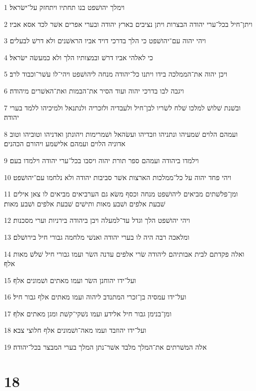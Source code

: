 \par 1 וימלך יהושׁפט בנו תחתיו ויתחזק על־ישׂראל׃
\par 2 ויתן־חיל בכל־ערי יהודה הבצרות ויתן נציבים בארץ יהודה ובערי אפרים אשׁר לכד אסא אביו׃
\par 3 ויהי יהוה עם־יהושׁפט כי הלך בדרכי דויד אביו הראשׁנים ולא דרשׁ לבעלים׃
\par 4 כי לאלהי אביו דרשׁ ובמצותיו הלך ולא כמעשׂה ישׂראל׃
\par 5 ויכן יהוה את־הממלכה בידו ויתנו כל־יהודה מנחה ליהושׁפט ויהי־לו עשׁר־וכבוד לרב׃
\par 6 ויגבה לבו בדרכי יהוה ועוד הסיר את־הבמות ואת־האשׁרים מיהודה׃
\par 7 ובשׁנת שׁלושׁ למלכו שׁלח לשׂריו לבן־חיל ולעבדיה ולזכריה ולנתנאל ולמיכיהו ללמד בערי יהודה׃
\par 8 ועמהם הלוים שׁמעיהו ונתניהו וזבדיהו ועשׂהאל ושׁמרימות ויהונתן ואדניהו וטוביהו וטוב אדוניה הלוים ועמהם אלישׁמע ויהורם הכהנים׃
\par 9 וילמדו ביהודה ועמהם ספר תורת יהוה ויסבו בכל־ערי יהודה וילמדו בעם׃
\par 10 ויהי פחד יהוה על כל־ממלכות הארצות אשׁר סביבות יהודה ולא נלחמו עם־יהושׁפט׃
\par 11 ומן־פלשׁתים מביאים ליהושׁפט מנחה וכסף משׂא גם הערביאים מביאים לו צאן אילים שׁבעת אלפים ושׁבע מאות ותישׁים שׁבעת אלפים ושׁבע מאות׃
\par 12 ויהי יהושׁפט הלך וגדל עד־למעלה ויבן ביהודה בירניות וערי מסכנות׃
\par 13 ומלאכה רבה היה לו בערי יהודה ואנשׁי מלחמה גבורי חיל בירושׁלם׃
\par 14 ואלה פקדתם לבית אבותיהם ליהודה שׂרי אלפים עדנה השׂר ועמו גבורי חיל שׁלשׁ מאות אלף׃
\par 15 ועל־ידו יהוחנן השׂר ועמו מאתים ושׁמונים אלף׃
\par 16 ועל־ידו עמסיה בן־זכרי המתנדב ליהוה ועמו מאתים אלף גבור חיל׃
\par 17 ומן־בנימן גבור חיל אלידע ועמו נשׁקי־קשׁת ומגן מאתים אלף׃
\par 18 ועל־ידו יהוזבד ועמו מאה־ושׁמונים אלף חלוצי צבא׃
\par 19 אלה המשׁרתים את־המלך מלבד אשׁר־נתן המלך בערי המבצר בכל־יהודה׃

\chapter{18}

